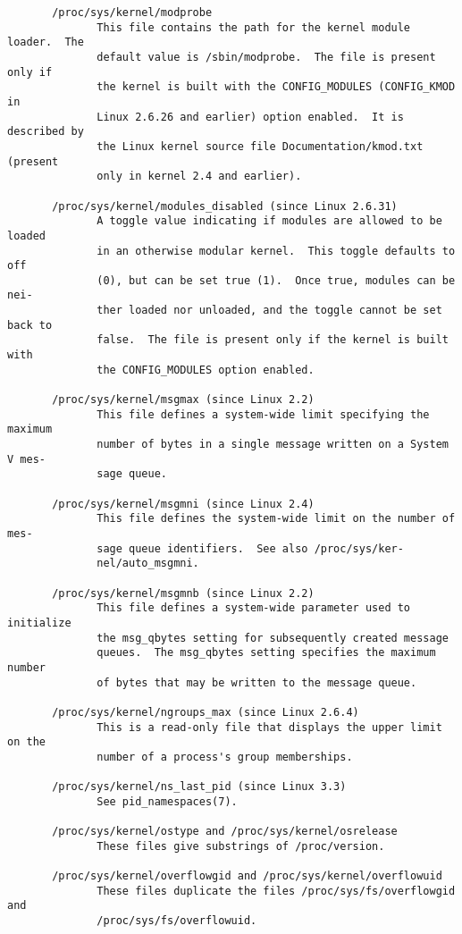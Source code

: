 \documentclass[]{article}
\begin{document}
\begin{verbatim}
       /proc/sys/kernel/modprobe
              This file contains the path for the kernel module loader.  The
              default value is /sbin/modprobe.  The file is present only if
              the kernel is built with the CONFIG_MODULES (CONFIG_KMOD in
              Linux 2.6.26 and earlier) option enabled.  It is described by
              the Linux kernel source file Documentation/kmod.txt (present
              only in kernel 2.4 and earlier).

       /proc/sys/kernel/modules_disabled (since Linux 2.6.31)
              A toggle value indicating if modules are allowed to be loaded
              in an otherwise modular kernel.  This toggle defaults to off
              (0), but can be set true (1).  Once true, modules can be nei‐
              ther loaded nor unloaded, and the toggle cannot be set back to
              false.  The file is present only if the kernel is built with
              the CONFIG_MODULES option enabled.

       /proc/sys/kernel/msgmax (since Linux 2.2)
              This file defines a system-wide limit specifying the maximum
              number of bytes in a single message written on a System V mes‐
              sage queue.

       /proc/sys/kernel/msgmni (since Linux 2.4)
              This file defines the system-wide limit on the number of mes‐
              sage queue identifiers.  See also /proc/sys/ker‐
              nel/auto_msgmni.

       /proc/sys/kernel/msgmnb (since Linux 2.2)
              This file defines a system-wide parameter used to initialize
              the msg_qbytes setting for subsequently created message
              queues.  The msg_qbytes setting specifies the maximum number
              of bytes that may be written to the message queue.

       /proc/sys/kernel/ngroups_max (since Linux 2.6.4)
              This is a read-only file that displays the upper limit on the
              number of a process's group memberships.

       /proc/sys/kernel/ns_last_pid (since Linux 3.3)
              See pid_namespaces(7).

       /proc/sys/kernel/ostype and /proc/sys/kernel/osrelease
              These files give substrings of /proc/version.

       /proc/sys/kernel/overflowgid and /proc/sys/kernel/overflowuid
              These files duplicate the files /proc/sys/fs/overflowgid and
              /proc/sys/fs/overflowuid.


\end{verbatim}
\end{document}
